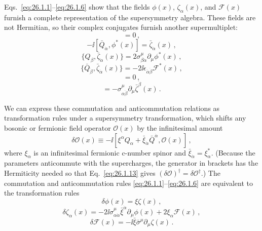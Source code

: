 Eqs.~\eqref{eq:26.1.1}--\eqref{eq:26.1.6} show that the fields
\(\phi(x)\), \(\zeta_\alpha(x)\), and \(\mathcal{F}(x)\) furnish a complete
representation of the supersymmetry algebra. These fields are not Hermitian,
so their complex conjugates furnish another supermultiplet:
\begin{equation}
  [Q_\alpha,\phi^*(x)]=0\,,
  \tag{26.1.7}\label{eq:26.1.7}
\end{equation}
\begin{equation}
  -\ii[\bar Q_{\dot\alpha},\phi^*(x)]
  =\bar\zeta_{\dot\alpha}(x)\,,
  \tag{26.1.8}\label{eq:26.1.8}
\end{equation}
\begin{equation}
  \{Q_\beta,\bar\zeta_{\dot\alpha}(x)\}
  =2\sigma^\mu_{\beta\dot\alpha}\partial_\mu\phi^*(x)\,,
  \tag{26.1.9}\label{eq:26.1.9}
\end{equation}
\begin{equation}
  \{\bar Q_{\dot\beta},\bar\zeta_{\dot\alpha}(x)\}
  =-2\ii\epsilon_{\dot\alpha\dot\beta}\mathcal{F}^*(x)\,,
  \tag{26.1.10}\label{eq:26.1.10}
\end{equation}
\begin{equation}
  [\bar Q_{\dot\alpha},\mathcal{F}^*(x)]=0\,,
  \tag{26.1.11}\label{eq:26.1.11}
\end{equation}
\begin{equation}
  [Q_\alpha,\mathcal{F}^*(x)]
  =-\sigma^\mu_{\alpha\dot\beta}
    \partial_\mu\bar\zeta^{\dot\beta}(x)\,.
  \tag{26.1.12}\label{eq:26.1.12}
\end{equation}

We can express these commutation and anticommutation relations as
transformation rules under a supersymmetry transformation, which shifts any
bosonic or fermionic field operator \(\mathcal{O}(x)\) by the infinitesimal
amount
\begin{equation}
  \delta\mathcal{O}(x)
  \equiv-\ii
  \left[\xi^\alpha Q_\alpha
    +\bar\xi_{\dot\alpha}\bar Q^{\dot\alpha},
    \mathcal{O}(x)\right]\,,
  \tag{26.1.13}\label{eq:26.1.13}
\end{equation}
where \(\xi_\alpha\) is an infinitesimal fermionic c-number spinor and
\(\bar\xi_{\dot\alpha}=\xi_\alpha^*\). (Because the parameters
anticommute with the supercharges, the generator in brackets has the
Hermiticity needed so that
Eq.~\eqref{eq:26.1.13} gives
\((\delta\mathcal{O})^\dagger=\delta\mathcal{O}^\dagger\).) The commutation
and anticommutation rules \eqref{eq:26.1.1}--\eqref{eq:26.1.6} are
equivalent to the transformation rules
\begin{equation}
  \delta\phi(x)
  =\xi\zeta(x)\,,
  \tag{26.1.14}\label{eq:26.1.14}
\end{equation}
\begin{equation}
  \delta\zeta_\alpha(x)
  =-2\ii\sigma^\mu_{\alpha\dot\alpha}\bar\xi^{\dot\alpha}
    \partial_\mu\phi(x)
    +2\xi_\alpha\mathcal{F}(x)\,,
  \tag{26.1.15}\label{eq:26.1.15}
\end{equation}
\begin{equation}
  \delta\mathcal{F}(x)
  =-\ii\bar\xi\bar\sigma^\mu\partial_\mu\zeta(x)\,.
  \tag{26.1.16}\label{eq:26.1.16}
\end{equation}

